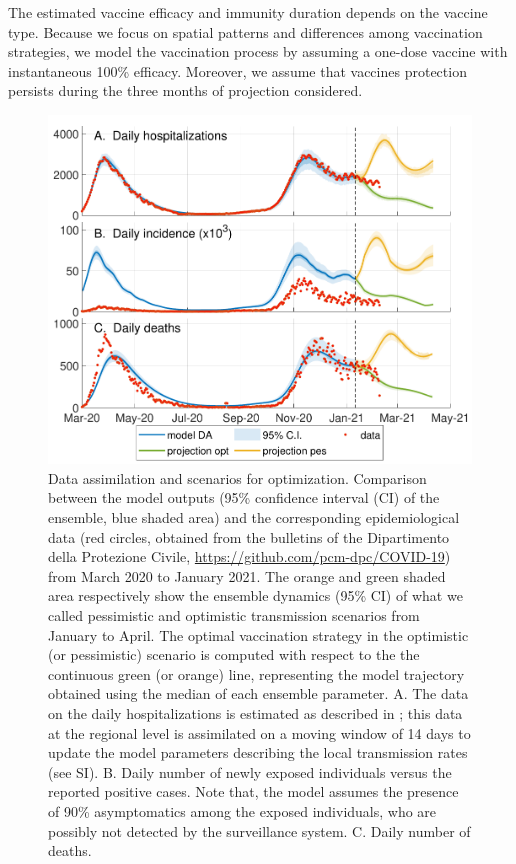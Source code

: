 The estimated vaccine efficacy and immunity duration depends on the vaccine type. Because we focus on spatial patterns and differences among vaccination strategies, we model the vaccination process by assuming a one-dose vaccine with instantaneous 100\% efficacy. %
Moreover, we assume that vaccines protection persists during the three months of projection considered.

\begin{figure}[!ht]%
    \centering
    \includegraphics{fig_italy-ocp/figures/DA_italy1.pdf}
    \caption[Data assimilation and scenarios for optimization]{Data assimilation and scenarios for optimization. Comparison between the model outputs (95\% confidence interval (CI) of the ensemble, blue shaded area) and the corresponding epidemiological data (red circles, obtained from the bulletins of the Dipartimento della Protezione Civile, {\url{https://github.com/pcm-dpc/COVID-19}}) from March 2020 to January 2021. The orange and green shaded area respectively show the ensemble dynamics (95\% CI) of what we called pessimistic and optimistic transmission scenarios from January to April. The optimal vaccination strategy in the optimistic (or pessimistic) scenario is computed with respect to the the continuous green (or orange) line, representing the model trajectory obtained using the median of each ensemble parameter. A. The data on the daily hospitalizations is estimated as described in \parencite{Bertuzzo:GeographyCOVID19Spread:2020}; this data at the regional level is assimilated on a moving window of 14 days to update the model parameters describing the local transmission rates (see SI). B. Daily number of newly exposed individuals versus the reported positive cases. Note that, the model assumes the presence of 90\% asymptomatics among the exposed individuals, who are possibly not detected by the surveillance system. C. Daily number of deaths. %
}
\end{figure}
